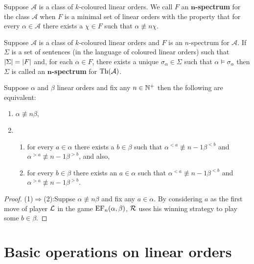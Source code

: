 \begin{dfn}[Spectrum]
	Suppose $\mathcal{A}$ is a class of $k$-coloured linear orders.  We call $F$ an $\mathbf{n}$\textbf{-spectrum} for the class $\mathcal{A}$ when $F$ is a minimal set of linear orders with the property that for every $\alpha\in\mathcal{A}$ there exists a $\chi\in F$ such that $\alpha\nequiv{n}\chi$.
\end{dfn}

\begin{dfn}
	Suppose $\mathcal{A}$ is a class of $k$-coloured linear orders and $F$ is an $n$-spectrum for $\mathcal{A}$.  If $\Sigma$ is a set of sentences (in the language of coloured linear orders) such that $\left\lvert\Sigma\right\rvert=\left\lvert F\right\rvert$ and, for each $\alpha\in F$, there exists a unique $\sigma_\alpha\in\Sigma$ such that $\alpha\models\sigma_\alpha$ then $\Sigma$ is called an $\mathbf{n}$\textbf{-spectrum} for $\operatorname{Th}(\mathcal{A})$.
\end{dfn}

\begin{lem}\label{lem:split}
	Suppose $\alpha$ and $\beta$ linear orders and fix any $n\in\mathbb{N}^{+}$ then the following are equivalent:
	\begin{enumerate}
		\item	$\alpha\nequiv{n}\beta$,
		\item	\begin{enumerate}
			      \item	for every $a\in\alpha$ there exists a $b\in\beta$ such that $\alpha^{<a}\nequiv{n-1}\beta^{<b}$ and $\alpha^{>a}\nequiv{n-1}\beta^{>b}$, and also,
			      \item	for every $b\in\beta$ there exists an $a\in\alpha$ such that $\alpha^{<a}\nequiv{n-1}\beta^{<b}$ and $\alpha^{>a}\nequiv{n-1}\beta^{>b}$.
		      \end{enumerate}
	\end{enumerate}
\end{lem}
\begin{proof}
	\noindent(1)$\Rightarrow$(2):\quad 	Suppse $\alpha\nequiv{n}\beta$ and fix any $a\in\alpha$.  By considering $a$ as the first move of player $\mathcal{L}$ in the game $\operatorname{EF}_n(\alpha,\beta)$, $\mathcal{R}$ uses his winning strategy to play some $b\in\beta$.
\end{proof}


\section{Basic operations on linear orders}

